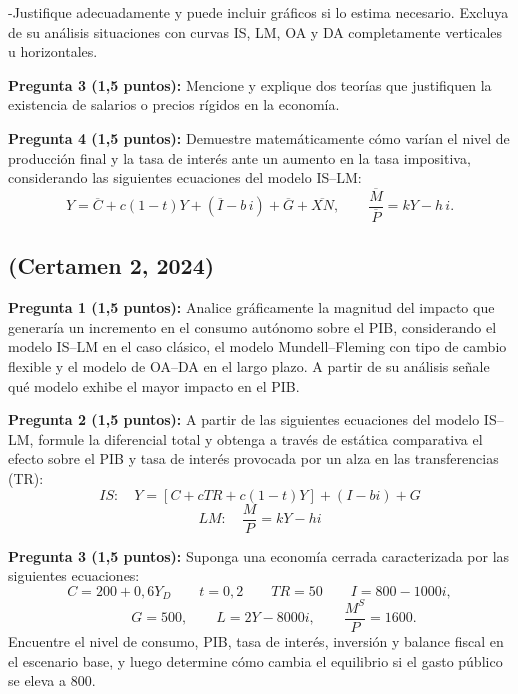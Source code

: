 \documentclass[11pt,addpoints]{article}
\begin{document}
\vspace*{0.1cm}
-Justifique adecuadamente y puede incluir gráficos si lo estima necesario. Excluya de su análisis situaciones con curvas IS, LM, OA y DA completamente verticales u horizontales.

\vspace{0.3cm}
\textbf{Pregunta 3 (1,5 puntos):}  
Mencione y explique dos teorías que justifiquen la existencia de salarios o precios rígidos en la economía.

\vspace{0.3cm}
\textbf{Pregunta 4 (1,5 puntos):}  
Demuestre matemáticamente cómo varían el nivel de producción final y la tasa de interés ante un aumento en la tasa impositiva, considerando las siguientes ecuaciones del modelo IS–LM:
\[
Y = \overline{C} + c(1 - t)Y + (\overline{I} - b\,i) + \overline{G} + \overline{XN}, 
\qquad
\frac{\overline{M}}{\overline{P}} = kY - h\,i.
\]

\newpage
\vspace*{0.1cm}
\subsection*{(Certamen 2, 2024)}

\textbf{Pregunta 1 (1,5 puntos):}  
Analice gráficamente la magnitud del impacto que generaría un incremento en el consumo autónomo sobre el PIB, considerando el modelo IS–LM en el caso clásico, el modelo Mundell–Fleming con tipo de cambio flexible y el modelo de OA–DA en el largo plazo. A partir de su análisis señale qué modelo exhibe el mayor impacto en el PIB.

\vspace{0.3cm}
\textbf{Pregunta 2 (1,5 puntos):}  
A partir de las siguientes ecuaciones del modelo IS–LM, formule la diferencial total y obtenga a través de estática comparativa el efecto sobre el PIB y tasa de interés provocada por un alza en las transferencias (TR):
\[
IS: \quad Y = [C + cTR + c(1 - t)Y] + (I - bi) + G
\]
\[
LM: \quad \frac{M}{P} = kY - hi
\]

\vspace{0.3cm}
\textbf{Pregunta 3 (1,5 puntos):}  
Suponga una economía cerrada caracterizada por las siguientes ecuaciones:
\[
C = 200 + 0{,}6Y_D \qquad t = 0,2 \qquad TR = 50 \qquad I = 800 - 1000i,
\]
\[
\qquad G = 500, \qquad L = 2Y - 8000i, \qquad \frac{M^S}{P} = 1600.
\]
Encuentre el nivel de consumo, PIB, tasa de interés, inversión y balance fiscal en el escenario base, y luego determine cómo cambia el equilibrio si el gasto público se eleva a 800.
\end{document}

